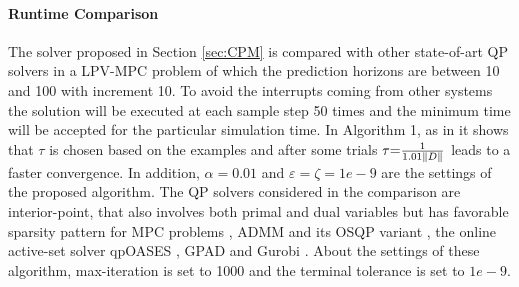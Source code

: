 \documentclass[journal]{IEEEtran}
\begin{document}
\paragraph{Runtime Comparison}{The solver proposed in Section \ref{sec:CPM} is compared with other state-of-art QP solvers in a LPV-MPC problem of which the prediction horizons are between 10 and 100 with increment 10. To avoid the interrupts coming from other systems the solution will be executed at each sample step 50 times and the minimum time will be accepted for the particular simulation time. In Algorithm 1, as in \cite{patrinos2011global} it shows that $\tau $ is chosen based on the examples and after some trials $\tau {\rm{ = }}\frac{1}{{{\rm{1}}{\rm{.01}}\left\| D \right\|}}$ leads to a faster convergence. In addition, $\alpha  = 0.01$ and $\varepsilon  = \zeta  = 1e - 9$ are the settings of the proposed algorithm. The QP solvers considered in the comparison are interior-point, that also involves both primal and dual variables but has favorable sparsity pattern for MPC problems \cite{wang2010fast}, ADMM \cite{boyd2011distributed} and its OSQP variant \cite{osqp-infeasibility}, the online active-set solver qpOASES \cite{ferreau2014qpoases}, GPAD \cite{patrinos2014accelerated} and Gurobi \cite{Gurobi-toolbox-web}. About the settings of these algorithm, max-iteration is set to 1000 and the terminal tolerance is set to $ 1e - 9 $.}
\end{document}

